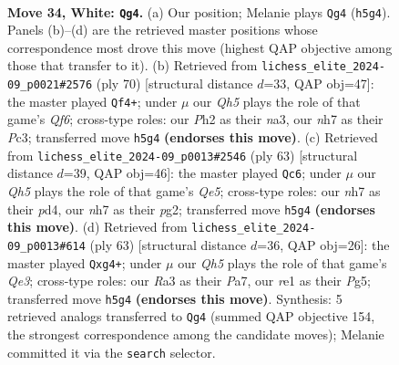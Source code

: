 \documentclass[11pt]{article}
\begin{document}
\clearpage

\begin{figure}[p]\centering
\begin{subfigure}{0.46\textwidth}\centering
\resizebox{\linewidth}{!}{%
\newchessgame
\chessboard[
  setfen={7k/p2p3n/2p2p2/7Q/1PqP4/R7/5PKP/4r3 w - - 0 34},
  showmover=false,
  pgfstyle=straightmove, color=movearrow, markmove={h5-g4}
]}
\caption{}
\end{subfigure}\hfill
\begin{subfigure}{0.46\textwidth}\centering
\resizebox{\linewidth}{!}{%
\newchessgame
\chessboard[
  setfen={8/3R4/p4Qpk/P1p4p/8/n1P2P1P/1q3P2/6K1 w - - 5 36},
  showmover=false,
  pgfstyle=straightmove, color=movearrow, markmove={f6-f4}
]}
\caption{}
\end{subfigure}
\\[4pt]
\begin{subfigure}{0.46\textwidth}\centering
\resizebox{\linewidth}{!}{%
\newchessgame
\chessboard[
  setfen={6rk/6p1/1p1p3p/8/PQ1Pq3/7P/6PK/5R2 b - - 1 32},
  showmover=false,
  pgfstyle=straightmove, color=movearrow, markmove={e4-c6}
]}
\caption{}
\end{subfigure}\hfill
\begin{subfigure}{0.46\textwidth}\centering
\resizebox{\linewidth}{!}{%
\newchessgame
\chessboard[
  setfen={6k1/ppQ2p2/4q3/3p2p1/3P2P1/2P5/PP3PK1/8 b - - 0 32},
  showmover=false,
  pgfstyle=straightmove, color=movearrow, markmove={e6-g4}
]}
\caption{}
\end{subfigure}
\caption{\textbf{Move 34, White: \texttt{Qg4}.} (a) Our position; Melanie plays \texttt{Qg4} (\texttt{h5g4}). Panels (b)--(d) are the retrieved master positions whose correspondence most drove this move (highest QAP objective among those that transfer to it). (b) Retrieved from \texttt{lichess\_elite\_2024-09\_p0021\#2576} (ply 70) [structural distance $d$=33, QAP obj=47]: the master played \texttt{Qf4+}; under $\mu$ our \emph{Qh5} plays the role of that game's \emph{Qf6}; cross-type roles: our \emph{P}h2 as their \emph{n}a3, our \emph{n}h7 as their \emph{P}c3; transferred move \texttt{h5g4} \textbf{(endorses this move)}. (c) Retrieved from \texttt{lichess\_elite\_2024-09\_p0013\#2546} (ply 63) [structural distance $d$=39, QAP obj=46]: the master played \texttt{Qc6}; under $\mu$ our \emph{Qh5} plays the role of that game's \emph{Qe5}; cross-type roles: our \emph{n}h7 as their \emph{p}d4, our \emph{n}h7 as their \emph{p}g2; transferred move \texttt{h5g4} \textbf{(endorses this move)}. (d) Retrieved from \texttt{lichess\_elite\_2024-09\_p0013\#614} (ply 63) [structural distance $d$=36, QAP obj=26]: the master played \texttt{Qxg4+}; under $\mu$ our \emph{Qh5} plays the role of that game's \emph{Qe3}; cross-type roles: our \emph{R}a3 as their \emph{P}a7, our \emph{r}e1 as their \emph{P}g5; transferred move \texttt{h5g4} \textbf{(endorses this move)}. Synthesis: 5 retrieved analogs transferred to \texttt{Qg4} (summed QAP objective 154, the strongest correspondence among the candidate moves); Melanie committed it via the \texttt{search} selector.}
\label{fig:thought-m66}
\end{figure}
\end{document}
